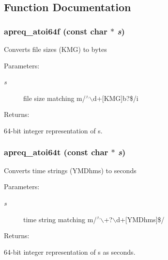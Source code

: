 \subsection{Function Documentation}
\subsubsection{ apreq\_\-atoi64f (const char $\ast$ {\em s})}\label{group__Utils_a17}


Converts file sizes (KMG) to bytes \begin{Desc}
\item[Parameters: ]\par
\begin{description}
\item[{\em 
s}]file size matching m/$^\wedge$$\backslash$d+[KMG]b?\$/i \end{description}
\end{Desc}
\begin{Desc}
\item[Returns: ]\par
64-bit integer representation of s. \end{Desc}
\subsubsection{ apreq\_\-atoi64t (const char $\ast$ {\em s})}\label{group__Utils_a18}


Converts time strings (YMDhms) to seconds \begin{Desc}
\item[Parameters: ]\par
\begin{description}
\item[{\em 
s}]time string matching m/$^\wedge$$\backslash$+?$\backslash$d+[YMDhms]\$/ \end{description}
\end{Desc}
\begin{Desc}
\item[Returns: ]\par
64-bit integer representation of s as seconds. \end{Desc}
